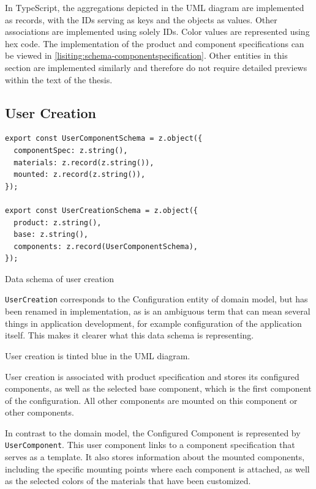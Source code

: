 In TypeScript, the aggregations depicted in the UML diagram are implemented as records, with the IDs serving as keys and the objects as values. Other associations are implemented using solely IDs. Color values are represented using hex code. The implementation of the product and component specifications can be viewed in \autoref{lisiting:schema-componentspecification}. Other entities in this section are implemented similarly and therefore do not require detailed previews within the text of the thesis.


\subsection{User Creation}

\begin{listing}[h]
\begin{verbatim}
export const UserComponentSchema = z.object({
  componentSpec: z.string(),
  materials: z.record(z.string()),
  mounted: z.record(z.string()),
});

export const UserCreationSchema = z.object({
  product: z.string(),
  base: z.string(),
  components: z.record(UserComponentSchema),
});
\end{verbatim}
\caption{Data schema of user creation}
\label{lisiting:schema-usercreation}
\end{listing}

\texttt{UserCreation} corresponds to the Configuration entity of domain model, but has been renamed in implementation, as  is an ambiguous term that can mean several things in application development, for example configuration of the application itself. This makes it clearer what this data schema is representing.

User creation is tinted blue in the UML diagram.

User creation is associated with product specification and stores its configured components, as well as the selected base component, which is the first component of the configuration. All other components are mounted on this component or other components.

In contrast to the domain model, the Configured Component is represented by \texttt{UserComponent}. This user component links to a component specification that serves as a template. It also stores information about the mounted components, including the specific mounting points where each component is attached, as well as the selected colors of the materials that have been customized.

